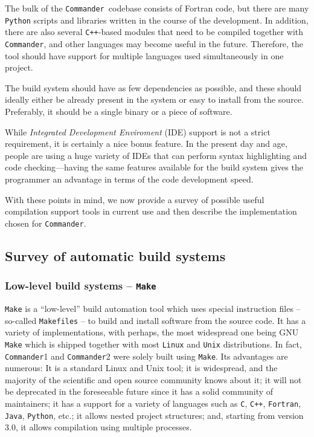 \documentclass[twocolumn]{openjournal}
\def\commander{\texttt{Commander}}
\begin{document}
 The bulk of the \commander\ codebase
consists of Fortran code, but there are many \texttt{Python} scripts and
libraries written in the course of the development. In addition, there are also
several \texttt{C++}-based modules that need to be compiled together with
\commander, and other languages may become useful in the future. Therefore, the
tool should have support for multiple languages used simultaneously in one
project.

 The build system should have as few
dependencies as possible, and these should ideally either be already present in
the system or easy to install from the source. Preferably, it should be a
single binary or a piece of software.

 While \textit{Integrated Development Enviroment}
(IDE) support is not a strict requirement, it is certainly a nice bonus
feature. In the present day and age, people are using a huge variety of IDEs
that can perform syntax highlighting and code checking—having the same features
available for the build system gives the programmer an advantage in terms of
the code development speed.

With these points in mind, we now provide a survey of possible useful
compilation support tools in current use and then describe the implementation
chosen for \commander.

\subsection{Survey of automatic build systems}
\label{sec:build_systems_overview}

\subsubsection{Low-level build systems -- \texttt{Make}}
\texttt{Make} is a ``low-level'' build automation tool which uses special
instruction files -- so-called \texttt{Makefiles} -- to build and install
software from the source code. It has a variety of implementations, with
perhaps, the most widespread one being GNU \texttt{Make} which is shipped
together with most \texttt{Linux} and \texttt{Unix} distributions. In fact,
\commander1 and \commander2 were solely built using \texttt{Make}. Its
advantages are numerous: It is a standard Linux and Unix tool; it is
widespread, and the majority of the scientific and open source community knows
about it; it will not be deprecated in the foreseeable future since it has a
solid community of maintainers; it has a support for a variety of languages such
as \texttt{C}, \texttt{C++}, \texttt{Fortran}, \texttt{Java}, \texttt{Python},
etc.; it allows nested project structures; and, starting from version 3.0, it
allows compilation using multiple processes.
\end{document}
